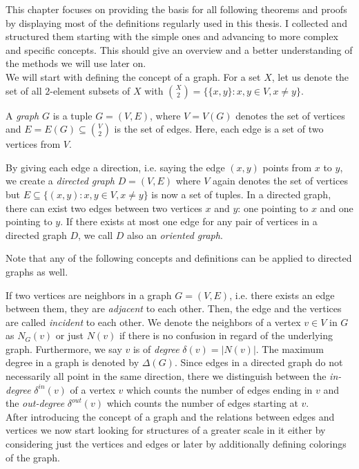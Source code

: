 This chapter focuses on providing the basis for all following theorems and proofs by displaying most of the definitions regularly used in this thesis. I collected and structured them starting with the simple ones and advancing to more complex and specific concepts. This should give an overview and a better understanding of the methods we will use later on.
\\[2ex]
We will start with defining the concept of a graph. For a set $X$, let us denote the set of all $2$-element subsets of $X$ with ${X\choose 2} =\lbrace \lbrace x,y\rbrace : x,y\in V, x\neq y\rbrace$.
\begin{defn}[Graph]
A \textit{graph} $G$ is a tuple $G=(V,E)$, where $V=V(G)$ denotes the set of vertices and $E=E(G)\subseteq {V\choose 2}$ is the set of edges. Here, each edge is a set of two vertices from $V$.
\end{defn}

By giving each edge a direction, i.e. saying the edge $(x,y)$ points from $x$ to $y$, we create a \textit{directed graph} $D=(V,E)$ where $V$ again denotes the set of vertices but $E\subseteq \lbrace (x,y) : x,y\in V, x\neq y\rbrace$ is now a set of tuples. In a directed graph, there can exist two edges between two vertices $x$ and $y$: one pointing to $x$ and one pointing to $y$. If there exists at most one edge for any pair of vertices in a directed graph $D$, we call $D$ also an \textit{oriented graph}.

\begin{note}
Note that any of the following concepts and definitions can be applied to directed graphs as well.
\end{note}

If two vertices are neighbors in a graph $G=(V,E)$, i.e. there exists an edge between them, they are \textit{adjacent} to each other. Then, the edge and the vertices are called \textit{incident} to each other. We denote the neighbors of a vertex $v\in V$ in $G$ as $N_G(v)$ or just $N(v)$ if there is no confusion in regard of the underlying graph. Furthermore, we say $v$ is of \textit{degree} $\delta (v) =\vert N(v)\vert$. The maximum degree in a graph is denoted by $\Delta (G)$. Since edges in a directed graph do not necessarily all point in the same direction, there we distinguish between the \textit{in-degree} $\delta^{in}(v)$ of a vertex $v$ which counts the number of edges ending in $v$ and the \textit{out-degree} $\delta^{out}(v)$ which counts the number of edges starting at $v$.
\\[2ex]
After introducing the concept of a graph and the relations between edges and vertices we now start looking for structures of a greater scale in it either by considering just the vertices and edges or later by additionally defining colorings of the graph. 

